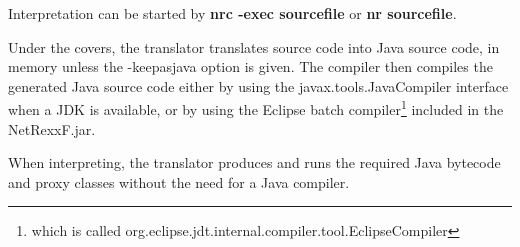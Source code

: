 Interpretation can be started by \textbf{nrc -exec sourcefile} or \textbf{nr sourcefile}.

Under the covers, the translator translates \nr{} source code into Java source code, in memory unless the -keepasjava 
option is given. The compiler then compiles the generated Java source code either by using the javax.tools.JavaCompiler interface
 when a JDK is available, or by using the Eclipse batch
 compiler\footnote{which is called org.eclipse.jdt.internal.compiler.tool.EclipseCompiler} included in the NetRexxF.jar.

When interpreting, the \nr{} translator produces and runs the required Java bytecode and proxy classes without the need for a Java compiler.

